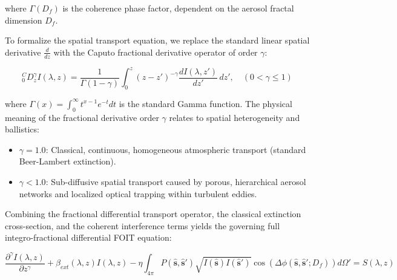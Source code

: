 \documentclass[12pt,a4paper]{article}
\begin{document}
where $\Gamma(D_f)$ is the coherence phase factor, dependent on the aerosol fractal dimension $D_f$.

To formalize the spatial transport equation, we replace the standard linear spatial derivative $\frac{d}{dz}$ with the Caputo fractional derivative operator of order $\gamma$:

\begin{equation}
{}^C_0 D^\gamma_z I(\lambda, z) = \frac{1}{\Gamma(1 - \gamma)} \int_0^z (z - z')^{-\gamma} \frac{d I(\lambda, z')}{dz'} \, dz', \quad (0 < \gamma \le 1)
\label{eq:caputo_derivative}
\end{equation}

where $\Gamma(x) = \int_0^\infty t^{x-1} e^{-t} dt$ is the standard Gamma function. The physical meaning of the fractional derivative order $\gamma$ relates to spatial heterogeneity and ballistics:
\begin{itemize}
    \item $\gamma = 1.0$: Classical, continuous, homogeneous atmospheric transport (standard Beer-Lambert extinction).
    \item $\gamma < 1.0$: Sub-diffusive spatial transport caused by porous, hierarchical aerosol networks and localized optical trapping within turbulent eddies.
\end{itemize}

Combining the fractional differential transport operator, the classical extinction cross-section, and the coherent interference terms yields the governing full integro-fractional differential FOIT equation:

\begin{equation}
\frac{\partial^\gamma I(\lambda, z)}{\partial z^\gamma} + \beta_{ext}(\lambda, z) I(\lambda, z) - \eta \int_{4\pi} P(\mathbf{\hat{s}}, \mathbf{\hat{s}}') \sqrt{I(\mathbf{\hat{s}}) I(\mathbf{\hat{s}}')} \cos\left( \Delta \phi(\mathbf{\hat{s}}, \mathbf{\hat{s}}'; D_f) \right) d\Omega' = S(\lambda, z)
\label{eq:foit_master}
\end{equation}
\end{document}
